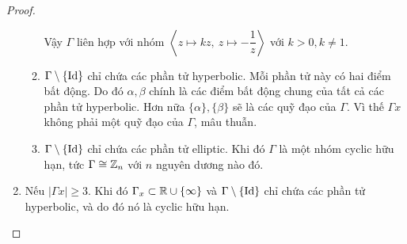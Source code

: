 \begin{proof}
\begin{enumerate}
\begin{enumerate}
            Vậy $\Gamma$ liên hợp với nhóm $\left<z\mapsto kz,~z\mapsto -\dfrac{1}{z}\right>$ với $k >0, k\neq 1$.

            \item $\Gamma\setminus\{\operatorname{Id}\}$ chỉ chứa các phần tử hyperbolic. Mỗi phần tử này có hai điểm bất động. Do đó $\alpha, \beta$ chính là các điểm bất động chung của tất cả các phần tử hyperbolic. Hơn nữa $\{\alpha\}, \{\beta\}$ sẽ là các quỹ đạo của $\Gamma$. Vì thế $\Gamma x$ không phải một quỹ đạo của $\Gamma$, mâu thuẫn.

            \item $\Gamma\setminus\{\operatorname{Id}\}$ chỉ chứa các phần tử elliptic. Khi đó $\Gamma$ là một nhóm cyclic hữu hạn, tức $\Gamma \cong \mathbb{Z}_n$ với $n$ nguyên dương nào đó.
        \end{enumerate}
        
        \item Nếu $|\Gamma x| \geq 3$. Khi đó $\Gamma_x \subset \mathbb{R} \cup \{\infty\}$ và $\Gamma\setminus\{\operatorname{Id}\}$ chỉ chứa các phần tử hyperbolic, và do đó nó là cyclic hữu hạn.
    \end{enumerate}
\end{proof}
